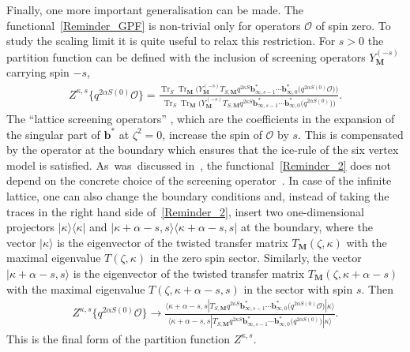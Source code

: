 \documentclass[pdftex]{sigma}
\numberwithin{equation}{section}
\DeclareMathOperator{\tr}{Tr}
\begin{document}
Finally, one more important generalisation can be made. The functional~\eqref{Reminder_GPF} is non-trivial only for operators $\mathcal{O}$ of spin zero. To study the scaling limit it is quite useful to relax this restriction. For $s>0$ the partition function can be defined with the inclusion of screening operators $Y_{\textbf{M}}^{(-s)}$ carrying spin $-s$,
\begin{align}\label{Reminder_2}
Z^{\kappa, s}\bigl\lbrace q^{2\alpha S(0)} \mathcal{O}\bigr\rbrace=
\frac{\tr_S \tr_\textbf{M} \bigl(Y_{\textbf{M}}^{(-s)} T_{S, \textbf{M}} q^{2\kappa S} \mathbf{b}^{*}_{\infty, s-1} \cdots \mathbf{b}^{*}_{\infty, 0}\bigl(q^{2\alpha S(0)}\mathcal{O}\bigr) \bigr)}
     {\tr_S \tr_\textbf{M} \bigl(Y_{\textbf{M}}^{(-s)} T_{S, \textbf{M}} q^{2\kappa S} \mathbf{b}^{*}_{\infty, s-1} \cdots \mathbf{b}^{*}_{\infty, 0}\bigl(q^{2\alpha S(0)}\bigr) \bigr)}.
\end{align}
The ``lattice screening operators'' , which are the coefficients in the expansion of the singular part of $\mathbf{b}^*$ at $\zeta^2=0$, increase the spin of $\mathcal{O}$ by $s$. This is compensated by the operator  at the boundary which ensures that the ice-rule of the six vertex model is satisfied. As~was~discussed in~\cite{HGS_4}, the functional~\eqref{Reminder_2} does not depend on the concrete choice of the screening operator~. In case of the infinite lattice, one can also change the boundary conditions and, instead of taking the traces in the right hand side of~\eqref{Reminder_2}, insert two one-dimensional projectors $|\kappa\rangle \langle\kappa|$ and $|\kappa+\alpha-s, s\rangle \langle\kappa+\alpha-s, s|$ at the boundary, where the vector $|\kappa\rangle$ is the eigenvector of the twisted transfer matrix $T_{\textbf{M}}(\zeta, \kappa)$ with the maximal eigenvalue $T(\zeta, \kappa)$ in the zero spin sector. Similarly, the vector $|\kappa+\alpha-s, s\rangle$ is the eigenvector of the twisted transfer matrix $T_{\textbf{M}}(\zeta, \kappa+\alpha-s)$ with the maximal eigenvalue $T(\zeta, \kappa+\alpha-s, s)$ in the sector with spin $s$. Then
\begin{align*}%
Z^{\kappa, s}\bigl\lbrace q^{2\alpha S(0)} \mathcal{O} \bigr\rbrace \rightarrow
\frac{\langle \kappa+\alpha-s, s| T_{S, \textbf{M}} q^{2\kappa S} \mathbf{b}^{*}_{\infty, s-1} \cdots \mathbf{b}^{*}_{\infty, 0}\bigl(q^{2\alpha S(0)}\mathcal{O}\bigr) |\kappa\rangle}
     {\langle \kappa+\alpha-s, s| T_{S, \textbf{M}} q^{2\kappa S} \mathbf{b}^{*}_{\infty, s-1} \cdots \mathbf{b}^{*}_{\infty, 0}\bigl(q^{2\alpha S(0)}           \bigr) |\kappa\rangle}.
\end{align*}
This is the final form of the partition function $Z^{\kappa, s}$.
\end{document}
